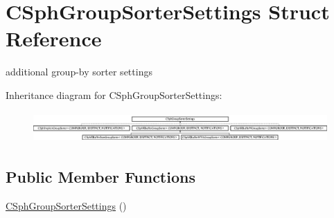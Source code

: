 \hypertarget{structCSphGroupSorterSettings}{\section{C\-Sph\-Group\-Sorter\-Settings Struct Reference}
\label{structCSphGroupSorterSettings}
}


additional group-\/by sorter settings  


Inheritance diagram for C\-Sph\-Group\-Sorter\-Settings\-:\begin{figure}[H]
\begin{center}
\leavevmode
\includegraphics[height=1.201717cm]{structCSphGroupSorterSettings}
\end{center}
\end{figure}
\subsection*{Public Member Functions}
\begin{DoxyCompactItemize}
\item 
\hyperlink{structCSphGroupSorterSettings_a5d33597f9c7d25699c4425cac250da2a}{C\-Sph\-Group\-Sorter\-Settings} ()
\end{DoxyCompactItemize}

